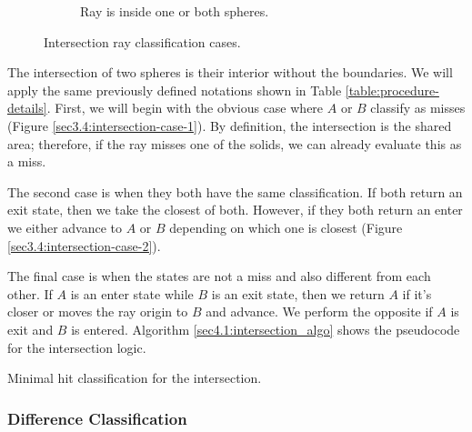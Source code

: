 \documentclass[a4paper,11pt,oneside]{article}
\begin{document}
\begin{figure}[ht]
\begin{subfigure}[b]{0.3\textwidth}
		\caption{Ray is inside one or both spheres.}
		\label{sec3.4:intersection-case-3}
	\end{subfigure}
	\caption{Intersection ray classification cases.}
	\label{sec3.4:sphere-intersection}
\end{figure}

The intersection of two spheres is their interior without the boundaries. We will apply the same previously defined notations shown in Table \ref{table:procedure-details}. First, we will begin with the obvious case where $A$ or $B$ classify as misses (Figure \ref{sec3.4:intersection-case-1}). By definition, the intersection is the shared area; therefore, if the ray misses one of the solids, we can already evaluate this as a miss.

The second case is when they both have the same classification. If both return an exit state, then we take the closest of both. However, if they both return an enter we either advance to $A$ or $B$ depending on which one is closest (Figure \ref{sec3.4:intersection-case-2}).

The final case is when the states are not a miss and also different from each other. If $A$ is an enter state while $B$ is an exit state, then we return $A$ if it's closer or moves the ray origin to $B$ and advance. We perform the opposite if $A$ is exit and $B$ is entered. Algorithm \ref{sec4.1:intersection_algo} shows the pseudocode for the intersection logic.

\begin{algorithm}
	\SetAlgoLined
	\caption{Minimal hit classification for the intersection.}
	\label{sec4.1:intersection_algo}
\end{algorithm}

\subsubsection{Difference Classification}
\label{section:minimal_difference_classficiation}
\end{document}
